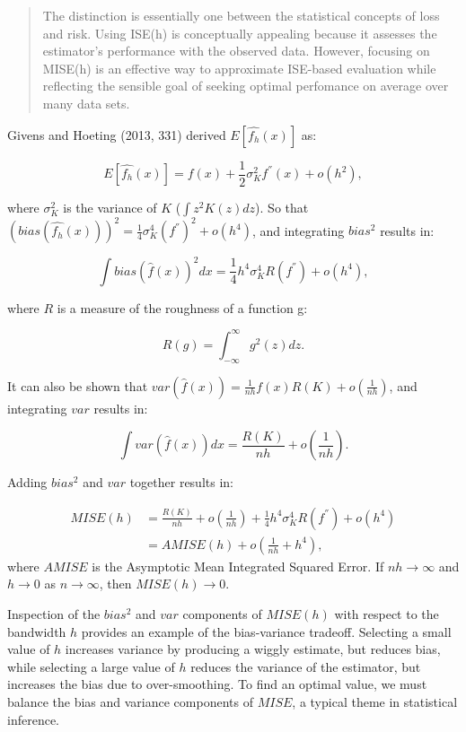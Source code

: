 \documentclass[]{article}
\begin{document}
\begin{quote}
The distinction is essentially one between the statistical concepts of
loss and risk. Using ISE(h) is conceptually appealing because it
assesses the estimator's performance with the observed data. However,
focusing on MISE(h) is an effective way to approximate ISE-based
evaluation while reflecting the sensible goal of seeking optimal
perfomance on average over many data sets.
\end{quote}

Givens and Hoeting (2013, 331) derived \(E[\widehat{f_h}(x)]\) as:

\[E[\widehat{f_h}(x)] = f(x) + \frac{1}{2} \sigma_K^2f^{''}(x) + o(h^2),\]

where \(\sigma_K^2\) is the variance of \(K\) (\(\int z^2 K(z) dz\)). So
that
\(\left(bias(\widehat{f_h}(x))\right)^2 = \frac{1}{4}\sigma_K^4 (f^{''})^2 + o(h^4)\),
and integrating \(bias^2\) results in:

\[\int bias\left(\hat{f}(x)\right)^2 dx = \frac{1}{4} h^4 \sigma_K^4 R(f^{''}) + o(h^4),\]

where \(R\) is a measure of the roughness of a function g:

\[R(g) = \int_{-\infty}^{\infty}g^2(z) dz.\]

It can also be shown that
\(var\left(\hat{f}(x)\right) = \frac{1}{nh}f(x)R(K) + o(\frac{1}{nh})\),
and integrating \(var\) results in:

\[\int var\left(\hat{f}(x)\right)dx = \frac{R(K)}{nh} + o(\frac{1}{nh}).\]

Adding \(bias^2\) and \(var\) together results in:

\[
\begin{aligned}
MISE(h) &= \frac{R(K)}{nh} + o\left(\frac{1}{nh}\right) + \frac{1}{4}h^4 \sigma_K^4R(f^{''}) + o\left(h^4\right) \\
&= AMISE(h) + o\left(\frac{1}{nh} + h^4\right),
\end{aligned}
\] where \(AMISE\) is the Asymptotic Mean Integrated Squared Error. If
\(nh \rightarrow \infty\) and \(h \rightarrow 0\) as
\(n \rightarrow \infty\), then \(MISE(h) \rightarrow 0\).

Inspection of the \(bias^2\) and \(var\) components of \(MISE(h)\) with
respect to the bandwidth \(h\) provides an example of the bias-variance
tradeoff. Selecting a small value of \(h\) increases variance by
producing a wiggly estimate, but reduces bias, while selecting a large
value of \(h\) reduces the variance of the estimator, but increases the
bias due to over-smoothing. To find an optimal value, we must balance
the bias and variance components of \(MISE\), a typical theme in
statistical inference.
\end{document}
